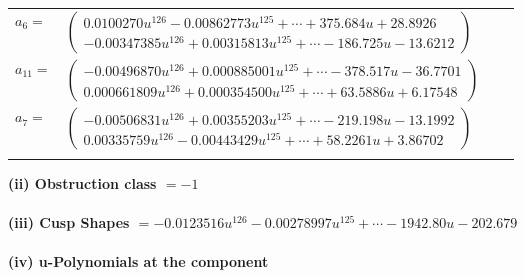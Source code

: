 \documentclass[1p]{elsarticle_modified}
\theoremstyle{definition}
\begin{document}
\begin{tabular}{m{7pt} m{180pt} m{7pt} m{180pt} }
\flushright $a_{6}=$&$\begin{pmatrix}0.0100270 u^{126}-0.00862773 u^{125}+\cdots+375.684 u+28.8926\\-0.00347385 u^{126}+0.00315813 u^{125}+\cdots-186.725 u-13.6212\end{pmatrix}$ \\
\flushright $a_{11}=$&$\begin{pmatrix}-0.00496870 u^{126}+0.000885001 u^{125}+\cdots-378.517 u-36.7701\\0.000661809 u^{126}+0.000354500 u^{125}+\cdots+63.5886 u+6.17548\end{pmatrix}$ \\
\flushright $a_{7}=$&$\begin{pmatrix}-0.00506831 u^{126}+0.00355203 u^{125}+\cdots-219.198 u-13.1992\\0.00335759 u^{126}-0.00443429 u^{125}+\cdots+58.2261 u+3.86702\end{pmatrix}$\\&\end{tabular}
\flushleft \textbf{(ii) Obstruction class $= -1$}\\~\\
\flushleft \textbf{(iii) Cusp Shapes $= -0.0123516 u^{126}-0.00278997 u^{125}+\cdots-1942.80 u-202.679$}\\~\\
\newpage\renewcommand{\arraystretch}{1}
\flushleft \textbf{(iv) u-Polynomials at the component}\newline \\
\end{document}
